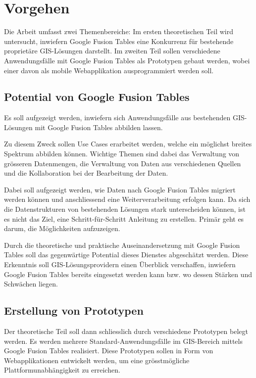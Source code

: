 \section{Vorgehen}
Die Arbeit umfasst zwei Themenbereiche: Im ersten theoretischen Teil wird untersucht, inwiefern Google Fusion Tables eine Konkurrenz für bestehende proprietäre \gls{GIS}-Lösungen darstellt. Im zweiten Teil sollen verschiedene Anwendungsfälle mit Google Fusion Tables als Prototypen gebaut werden, wobei einer davon als mobile Webapplikation ausprogrammiert werden soll.

\subsection{Potential von Google Fusion Tables}
Es soll aufgezeigt werden, inwiefern sich Anwendungsfälle aus bestehenden \gls{GIS}-Lösungen mit Google Fusion Tables abbilden lassen.

Zu diesem Zweck sollen Use Cases erarbeitet werden, welche ein möglichst breites Spektrum abbilden können. Wichtige Themen sind dabei das Verwaltung von grösseren Datenmengen, die Verwaltung von Daten aus verschiedenen Quellen und die Kollaboration bei der Bearbeitung der Daten.

Dabei soll aufgezeigt werden, wie Daten nach Google Fusion Tables migriert werden können und anschliessend eine Weiterverarbeitung erfolgen kann. Da sich die Datenstrukturen von bestehenden Lösungen stark unterscheiden können, ist es nicht das Ziel, eine Schritt-für-Schritt Anleitung zu erstellen. Primär geht es darum, die Möglichkeiten aufzuzeigen.

Durch die theoretische und praktische Auseinandersetzung mit Google Fusion Tables soll das gegenwärtige Potential dieses Dienstes abgeschätzt werden. Diese Erkenntnis soll \gls{GIS}-Lösungsprovidern einen Überblick verschaffen, inwiefern Google Fusion Tables bereits eingesetzt werden kann bzw. wo dessen Stärken und Schwächen liegen.

\subsection{Erstellung von Prototypen}
Der theoretische Teil soll dann schliesslich durch verschiedene Prototypen belegt werden. Es werden mehrere Standard-Anwendungsfälle im \gls{GIS}-Bereich mittels Google Fusion Tables realisiert. Diese Prototypen sollen in Form von Webapplikationen entwickelt werden, um eine grösstmögliche Plattformunabhängigkeit zu erreichen.

